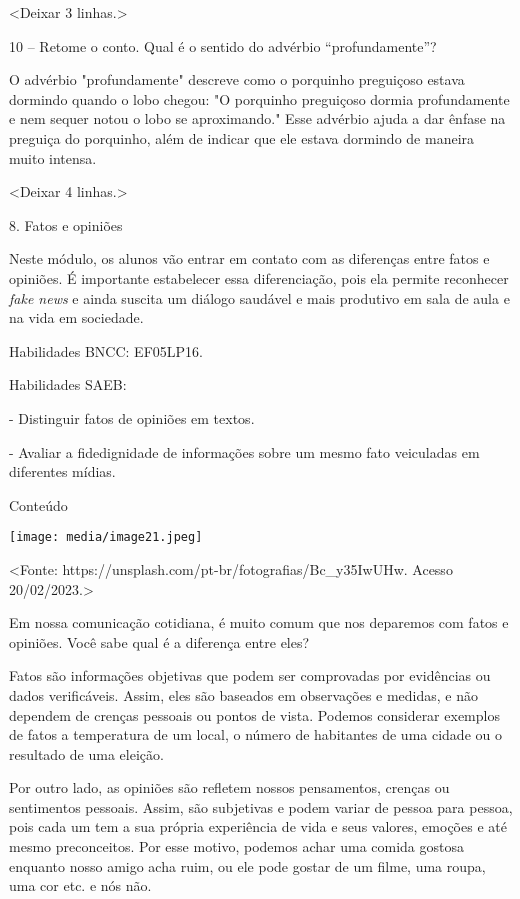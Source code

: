 \textless{}Deixar 3 linhas.\textgreater{}

10 -- Retome o conto. Qual é o sentido do advérbio ``profundamente''?

O advérbio "profundamente" descreve como o porquinho preguiçoso estava
dormindo quando o lobo chegou: "O porquinho preguiçoso dormia
profundamente e nem sequer notou o lobo se aproximando." Esse advérbio
ajuda a dar ênfase na preguiça do porquinho, além de indicar que ele
estava dormindo de maneira muito intensa.

\textless{}Deixar 4 linhas.\textgreater{}

8. Fatos e opiniões

Neste módulo, os alunos vão entrar em contato com as diferenças entre
fatos e opiniões. É importante estabelecer essa diferenciação, pois ela
permite reconhecer \emph{fake news} e ainda suscita um diálogo saudável
e mais produtivo em sala de aula e na vida em sociedade.

Habilidades BNCC: EF05LP16.

Habilidades SAEB:

- Distinguir fatos de opiniões em textos.

- Avaliar a fidedignidade de informações sobre um mesmo fato veiculadas
em diferentes mídias.

Conteúdo

\texttt{[image: media/image21.jpeg]}

\textless{}Fonte: https://unsplash.com/pt-br/fotografias/Bc\_y35IwUHw.
Acesso 20/02/2023.\textgreater{}

Em nossa comunicação cotidiana, é muito comum que nos deparemos com
fatos e opiniões. Você sabe qual é a diferença entre eles?

Fatos são informações objetivas que podem ser comprovadas por evidências
ou dados verificáveis. Assim, eles são baseados em observações e
medidas, e não dependem de crenças pessoais ou pontos de vista. Podemos
considerar exemplos de fatos a temperatura de um local, o número de
habitantes de uma cidade ou o resultado de uma eleição.

Por outro lado, as opiniões são refletem nossos pensamentos, crenças ou
sentimentos pessoais. Assim, são subjetivas e podem variar de pessoa
para pessoa, pois cada um tem a sua própria experiência de vida e seus
valores, emoções e até mesmo preconceitos. Por esse motivo, podemos
achar uma comida gostosa enquanto nosso amigo acha ruim, ou ele pode
gostar de um filme, uma roupa, uma cor etc. e nós não.

